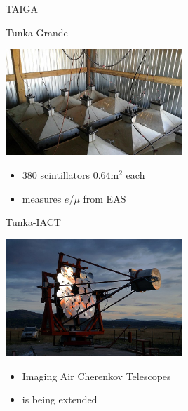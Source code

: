 \begin{frame}{TAIGA}
\vspace{-1ex}
\begin{minipage}[t]{0.48\textwidth}
  \begin{block}{\small Tunka-Grande}
    \parbox[c][0.21\textheight][t]{0.43\textwidth}{
      \includegraphics[width=0.50\textwidth]{pics/Hiller_Roman-005.jpg}
    }
    \hfill
    \parbox[c][0.21\textheight][t]{0.55\textwidth}{
      \begin{itemize}
        \setlength{\itemsep}{0pt}
        \item 380 scintillators 0.64m$^2$ each
        \item measures $e$/$\mu$ from EAS
      \end{itemize}
    }
  \end{block}
\end{minipage}
\hfill
\begin{minipage}[t]{0.48\textwidth}
  \begin{block}{\small Tunka-IACT}
    \parbox[c][0.21\textheight][t]{0.43\textwidth}{
      \includegraphics[width=0.50\textwidth]{pics/Tunka-Iact.jpg}
    }
    \hfill
    \parbox[c][0.21\textheight][t]{0.55\textwidth}{
      \begin{itemize}
        \setlength{\itemsep}{0pt}
        \item Imaging Air Cherenkov Telescopes
        \item is being extended
      \end{itemize}
    }
  \end{block}
\end{minipage}
\end{frame}

